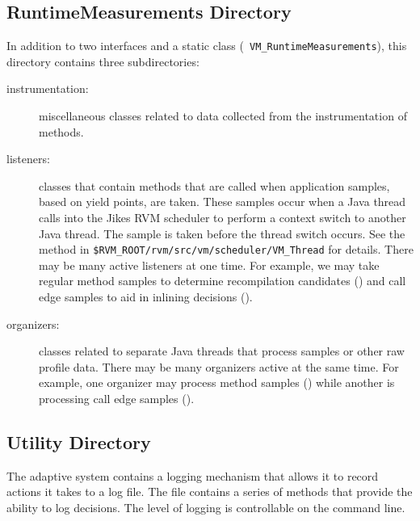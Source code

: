 \subsection{RuntimeMeasurements Directory}
In addition to two interfaces and a static class ({\tt
VM\_RuntimeMeasurements}),
this directory contains three subdirectories:
\begin{description}
\item [instrumentation:] miscellaneous classes related to
data collected from the instrumentation of methods.  

\item [listeners:] classes that contain methods that 
are called when application samples,
based on yield points, are taken.  These samples occur when a Java
thread calls into the Jikes RVM scheduler to perform a context switch
to another Java thread.  The sample is taken before the thread switch occurs.
See the 
 method in
{\tt \$RVM\_ROOT/rvm/src/vm/scheduler/VM\_Thread} for details.
There may be many active listeners at one
time.  For example, we may take regular method samples to determine
recompilation candidates () and call edge 
samples to aid in inlining decisions ().  

\item [organizers:]  classes related to separate Java threads that
process samples or other raw profile data.  There may be many
organizers active at the same time.
For example, one organizer may process method samples 
() while
another is processing 
call edge samples (). 
\end{description}

\JikesTMFooter

\subsection{Utility Directory}
The adaptive system contains a logging mechanism that allows it to
record actions it takes to a log file.  The file  
contains a series of methods that provide the ability to log
decisions.  The level of logging is controllable on the command line.

